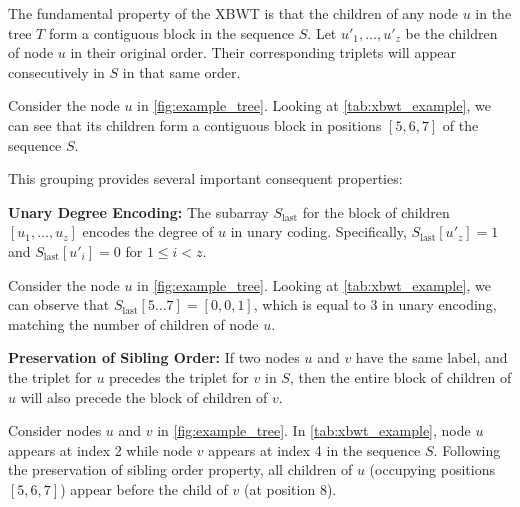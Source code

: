 The fundamental property of the XBWT is that the children of any node $u$ in the tree $T$ form a contiguous block in the sequence $S$. Let $u'_1, \dots, u'_z$ be the children of node $u$ in their original order. Their corresponding triplets will appear consecutively in $S$ in that same order.
\begin{example}
    Consider the node $u$ in \cref{fig:example_tree}. Looking at \cref{tab:xbwt_example}, we can see that its children form a contiguous block in positions $[5, 6, 7]$ of the sequence $S$.
\end{example}

This grouping provides several important consequent properties:

\textbf{Unary Degree Encoding:} The subarray $S_{\text{last}}$ for the block of children $[u_1, \dots, u_z]$ encodes the degree of $u$ in unary coding. Specifically, $S_{\text{last}}[u'_z] = 1$ and $S_{\text{last}}[u'_i] = 0$ for $1 \leq i < z$. 
\begin{example}
    Consider the node $u$ in \cref{fig:example_tree}. Looking at \cref{tab:xbwt_example}, we can observe that $S_{\text{last}}[5 \dots 7] = [0, 0, 1]$, which is equal to 3 in unary encoding, matching the number of children of node $u$.
\end{example}

\textbf{Preservation of Sibling Order:} If two nodes $u$ and $v$ have the same label, and the triplet for $u$ precedes the triplet for $v$ in $S$, then the entire block of children of $u$ will also precede the block of children of $v$.
\begin{example}
    Consider nodes $u$ and $v$ in \cref{fig:example_tree}. In \cref{tab:xbwt_example}, node $u$ appears at index 2 while node $v$ appears at index 4 in the sequence $S$. Following the preservation of sibling order property, all children of $u$ (occupying positions $[5, 6, 7]$) appear before the child of $v$ (at position $8$).
\end{example}

